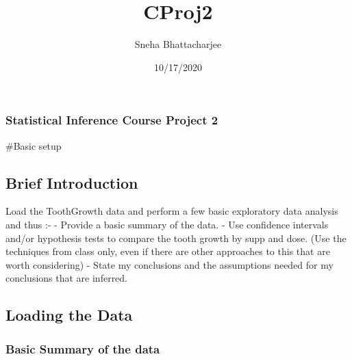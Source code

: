 \documentclass[
]{article}
\title{CProj2}
\author{Sneha Bhattacharjee}
\date{10/17/2020}
\newenvironment{Shaded}{\begin{snugshade}}{\end{snugshade}}
\newcommand{\CommentTok}[1]{\textcolor[rgb]{0.56,0.35,0.01}{\textit{#1}}}
\newcommand{\KeywordTok}[1]{\textcolor[rgb]{0.13,0.29,0.53}{\textbf{#1}}}
\newcommand{\NormalTok}[1]{#1}
\newcommand{\OperatorTok}[1]{\textcolor[rgb]{0.81,0.36,0.00}{\textbf{#1}}}
\newcommand{\StringTok}[1]{\textcolor[rgb]{0.31,0.60,0.02}{#1}}
\begin{document}
\maketitle

\hypertarget{statistical-inference-course-project-2}{%
\subsubsection{Statistical Inference Course Project
2}\label{statistical-inference-course-project-2}}

\#Basic setup

\hypertarget{brief-introduction}{%
\subsection{Brief Introduction}\label{brief-introduction}}

Load the ToothGrowth data and perform a few basic exploratory data
analysis and thus :- - Provide a basic summary of the data. - Use
confidence intervals and/or hypothesis tests to compare the tooth growth
by supp and dose. (Use the techniques from class only, even if there are
other approaches to this that are worth considering) - State my
conclusions and the assumptions needed for my conclusions that are
inferred.

\hypertarget{loading-the-data}{%
\subsection{Loading the Data}\label{loading-the-data}}

\begin{Shaded}
\end{Shaded}

\hypertarget{basic-summary-of-the-data}{%
\subsubsection{Basic Summary of the
data}\label{basic-summary-of-the-data}}
\end{document}
